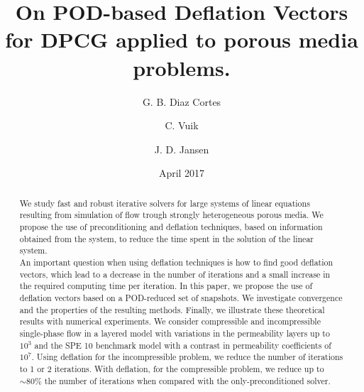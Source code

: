 \documentclass[12pt]{article}
\title{On POD-based Deflation Vectors for DPCG applied to porous media problems.}
\author[1]{G. B. Diaz Cortes}
\author[1]{C. Vuik}
\author[2]{J. D. Jansen}
\affil[1]{Department of Applied Mathematics, TU Delft}
\affil[2]{Department of Geoscience \& Engineering, TU Delft}
\date{April 2017}
\begin{document}
\newpage
\maketitle
\begin{abstract}
     We study fast and robust iterative solvers for large systems of linear equations resulting from simulation of flow trough strongly heterogeneous porous media. We propose the use of preconditioning and deflation techniques, based on information obtained from the system, to reduce the time spent in the solution of the linear system.\\
     An important question when using deflation techniques is how to find good deflation vectors, which lead to a decrease in the number of iterations and a small increase in the required computing time per iteration. In this paper, we propose the use of deflation vectors based on a POD-reduced set of snapshots. We investigate convergence and the properties of the resulting methods. 
     Finally, we illustrate these theoretical results with numerical experiments.  
 We consider compressible and incompressible single-phase flow in a layered model with variations in the permeability layers up to $10^{3}$ and the SPE 10 benchmark model with a contrast in permeability coefficients of $10^{7}$. Using deflation for the incompressible problem, we reduce the number of iterations to 1 or 2 iterations. With deflation, for the compressible problem, we reduce up to $\sim 80\%$ the number of iterations when compared with the only-preconditioned solver.\\
\end{abstract}
\newpage
\end{document}
